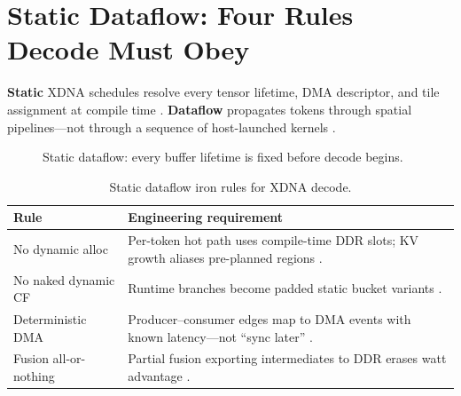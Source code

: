 \section{Static Dataflow: Four Rules Decode Must Obey}
\label{sec:ch05_static_dataflow_rules}

\textbf{Static} XDNA schedules resolve every tensor lifetime, DMA descriptor, and tile assignment at compile time \citep{amd2024xdna,amd2024aie}.
\textbf{Dataflow} propagates tokens through spatial pipelines---not through a sequence of host-launched kernels \citep{chen2020compilerbasedhardw,yirage2026}.

\begin{figure}[t]
\centering
{}
\caption{Static dataflow: every buffer lifetime is fixed before decode begins.}
\label{fig:static_dataflow_rules_architecture}
\end{figure}

\begin{table}[t]
\centering
\caption{Static dataflow iron rules for XDNA decode.}
\label{tab:ch05_static_rules}
\begin{tabular}{@{}p{2.4cm}p{4.8cm}@{}}
\toprule
\textbf{Rule} & \textbf{Engineering requirement} \\
\midrule
No dynamic alloc & Per-token hot path uses compile-time DDR slots; KV growth aliases pre-planned regions \citep{kwon2023vllm}. \\
No naked dynamic CF & Runtime branches become padded static bucket variants \citep{patel2025llminference}. \\
Deterministic DMA & Producer--consumer edges map to DMA events with known latency---not ``sync later'' \citep{amd2024aie}. \\
Fusion all-or-nothing & Partial fusion exporting intermediates to DDR erases watt advantage \citep{yirage2026,taxbreak2026}. \\
\bottomrule
\end{tabular}
\end{table}

